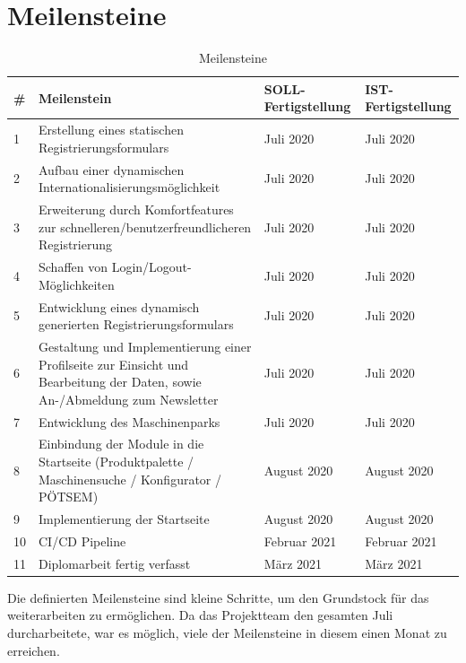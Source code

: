 \section{Meilensteine}
\renewcommand\tabularxcolumn[1]{>{\centering\arraybackslash}m{#1}}
\begin{table}[H]
	\centering
{
	\setlength{\arrayrulewidth}{1pt}
\begin{tabular}[H]{|l|m{8cm}|p{2.5cm}|p{2.5cm}|}
	\hline
	\rowcolor[gray]{.6}	\textbf{\#} & \textbf{Meilenstein} & \textbf{SOLL-Fertigstellung} & \textbf{IST-Fertigstellung} \\
	\hline
	1 & Erstellung eines statischen Registrierungsformulars & Juli 2020 & Juli 2020 \\
	\hline
	2 & Aufbau einer dynamischen Internationalisierungsmöglichkeit & Juli 2020 & Juli 2020 \\	
	\hline
	3 & Erweiterung durch Komfortfeatures zur schnelleren/benutzerfreundlicheren Registrierung & Juli 2020 & Juli 2020 \\
	\hline
	4 & Schaffen von Login/Logout-Möglichkeiten & Juli 2020 & Juli 2020 \\	
	\hline
	5 & Entwicklung eines dynamisch generierten Registrierungsformulars & Juli 2020 & Juli 2020 \\	
	\hline
	6 & Gestaltung und Implementierung einer Profilseite zur Einsicht und Bearbeitung der Daten, sowie An-/Abmeldung zum Newsletter & Juli 2020 & Juli 2020 \\	
	\hline
	7 & Entwicklung des Maschinenparks & Juli 2020 & Juli 2020 \\	
	\hline
	8 & Einbindung der Module in die Startseite (Produktpalette / Maschinensuche / Konfigurator / PÖTSEM) & August 2020 & August 2020 \\	
	\hline
	9 & Implementierung der Startseite & August 2020 & August 2020 \\	
	\hline
	10 & CI/CD Pipeline & Februar 2021 & Februar 2021 \\	
	\hline	
	11 & Diplomarbeit fertig verfasst & März 2021 & März 2021 \\
	\hline
\end{tabular}
}
\caption{Meilensteine}
\end{table}
Die definierten Meilensteine sind kleine Schritte, um den Grundstock für das weiterarbeiten zu ermöglichen. Da das Projektteam den gesamten Juli durcharbeitete, war es möglich, viele der Meilensteine in diesem einen Monat zu erreichen. 

